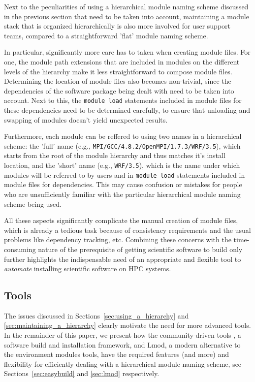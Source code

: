 Next to the peculiarities of using a hierarchical module naming scheme discussed in
the previous section that need to be taken into account, maintaining a module stack
that is organized hierarchically is also more involved for user support teams,
compared to a straightforward 'flat' module naming scheme.

In particular, significantly more care has to taken when creating
module files. For one, the module path extensions that are included in modules
on the different levels of the hierarchy make it less straightforward to compose
module files. Determining the location of module files also becomes
non-trivial, since the dependencies of the software package being dealt with need
to be taken into account. Next to this, the \texttt{module load} statements included
in module files for these dependencies need to be determined carefully, to ensure
that unloading and swapping of modules doesn't yield unexpected results.

Furthermore, each module can be reffered to using two names in a hierarchical scheme:
the 'full' name (e.g., \texttt{MPI/GCC/4.8.2/OpenMPI/1.7.3/WRF/3.5}), which
starts from the root of the module hierarchy and thus matches it's install location,
and the 'short' name (e.g., \texttt{WRF/3.5}), which is the name under which modules
will be referred to by users and in \texttt{module load} statements included in
module files for dependencies. This may cause confusion or mistakes for people who
are unsufficiently familiar with the particular hierarchical module naming scheme
being used.

All these aspects significantly complicate the manual creation of module files, which
is already a tedious task because of consistency requirements and the usual problems
like dependency tracking, etc. Combining these concerns with the time-consuming
nature of the prerequisite of getting scientific software to build only further
highlights the indispensable need of an appropriate and flexible tool to
\emph{automate} installing scientific software on HPC systems.

\subsection{Tools}
\label{sec:tools_for_hierarchical}

The issues discussed in Sections~\ref{sec:using_a_hierarchy} and
\ref{sec:maintaining_a_hierarchy} clearly motivate the need for more advanced tools.
In the remainder of this paper, we present how the community-driven tools
\easybuild{}, a software build and installation framework, and Lmod, a modern
alternative to the environment modules tools, have the required features (and more)
and flexibility for efficiently dealing with a hierarchical module naming scheme,
see Sections~\ref{sec:easybuild} and \ref{sec:lmod} respectively.
